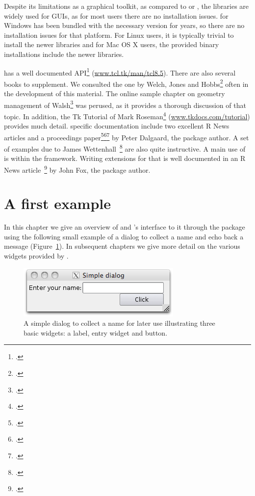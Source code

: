 Despite its limitations as a graphical toolkit, as compared to \GTK\/
or \Qt, the \TK\/ libraries are widely used for \R\/ GUIs, as for most
users there are no installation issues. \R\/ for Windows has been
bundled with the necessary \TK\/ version for years, so there are no
installation issues for that platform. For Linux users, it is
typically trivial to install the newer libraries and for Mac OS X
users, the provided binary installations include the newer \TK\/
libraries.

\Tk{} has a well documented API\footcite{TclTk:Api}
(\url{www.tcl.tk/man/tcl8.5}).  There are also several books to
supplement. We consulted the one by Welch, Jones and
Hobbs\footcite{beedub} often in the development of this
material. The online sample chapter on geometry management
of Walsh\footcite{Walsh} was perused, as it provides a thorough discussion
of that topic. In addition, the Tk Tutorial of Mark
Roseman\footcite{TclTk:Tutorial} (\url{www.tkdocs.com/tutorial})
provides much detail. \R{} specific documentation include two
excellent R News articles and a proceedings
paper\footcite{Rnews:Dalgaard:2001a}\footcite{Rnews:Dalgaard:2002}\footcite{Dalgaard-DSC}
by Peter Dalgaard, the package author. A
set of examples due to James Wettenhall~\footcite{Wettenhall} are also
quite instructive. A main use of  is within the 
framework. Writing extensions for that is well documented in an R News
article~\footcite{Rnews:Fox:2007} by John Fox, the package author.
 

\section{A first example}
\label{sec:first-example}

In this chapter we give an overview of \Tk\/ and \R's interface to it
through the  package using the following small example of a
dialog to collect a name and echo back a message
(Figure~\ref{fig:tcltk-simple-dialog}). In subsequent chapters we give
more detail on the various widgets provided by \Tk.

\begin{figure}
  \centering
  \includegraphics[width=.6\textwidth]{fig-tcltk-themed-dialog.png}
  \caption{A simple dialog to collect a name for later use
    illustrating three basic widgets: a label, entry widget and
    button.}
  \label{fig:tcltk-simple-dialog}
\end{figure}


